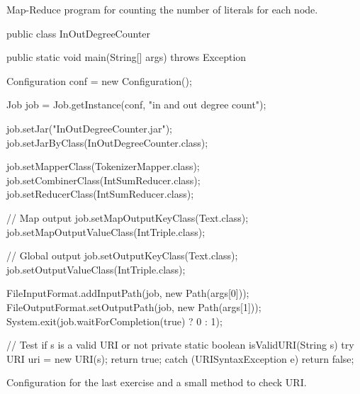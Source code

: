 \documentclass[a4paper,11pt]{report}
\begin{document}
\begin{listing}[ht]
\centering
{}
\caption{Map-Reduce program for counting the number of literals for each node.}
\label{lst:ex4}
\end{listing}

\begin{listing}[ht]
\centering
\begin{javacode}
public class InOutDegreeCounter {

    public static void main(String[] args) throws Exception {
        Configuration conf = new Configuration();

        Job job = Job.getInstance(conf, "in and out degree count");

        job.setJar("InOutDegreeCounter.jar");
        job.setJarByClass(InOutDegreeCounter.class);

        job.setMapperClass(TokenizerMapper.class);
        job.setCombinerClass(IntSumReducer.class);
        job.setReducerClass(IntSumReducer.class);

        // Map output
        job.setMapOutputKeyClass(Text.class);
        job.setMapOutputValueClass(IntTriple.class);

        // Global output
        job.setOutputKeyClass(Text.class);
        job.setOutputValueClass(IntTriple.class);

        FileInputFormat.addInputPath(job, new Path(args[0]));
        FileOutputFormat.setOutputPath(job, new Path(args[1]));
        System.exit(job.waitForCompletion(true) ? 0 : 1);
    }

    // Test if s is a valid URI or not
    private static boolean isValidURI(String s) {
        try {
            URI uri = new URI(s);
            return true;
        } catch (URISyntaxException e) {
            return false;
        }
    }
 }
\end{javacode}
\caption{Configuration for the last exercise and a small method to check URI.}
\label{lst:ex5}
\end{listing}
\end{document}

